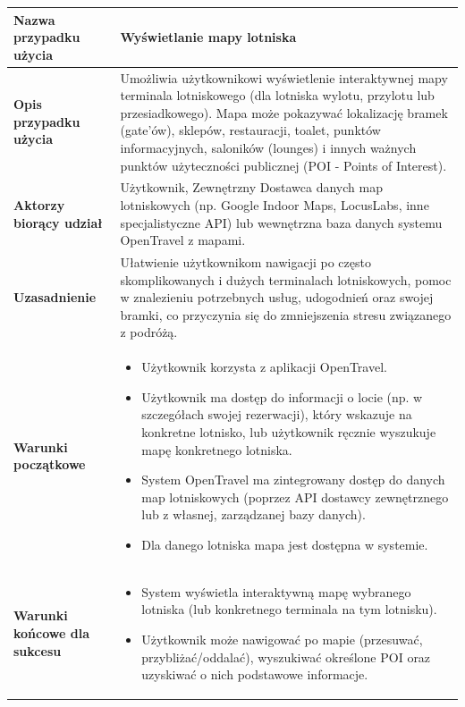 \documentclass[a4paper,12pt]{article}
\begin{document}
\begin{longtable}{|p{\pierwszakolumnaszerokoscPUBLMapaLot}|p{\drugakolumnaszerokoscPUBLMapaLot}|}
    \textbf{Nazwa przypadku użycia} & Wyświetlanie mapy lotniska \\
    \hline
    \textbf{Opis przypadku użycia} & Umożliwia użytkownikowi wyświetlenie interaktywnej mapy terminala lotniskowego (dla lotniska wylotu, przylotu lub przesiadkowego). Mapa może pokazywać lokalizację bramek (gate'ów), sklepów, restauracji, toalet, punktów informacyjnych, saloników (lounges) i innych ważnych punktów użyteczności publicznej (POI - Points of Interest). \\
    \hline
    \textbf{Aktorzy biorący udział} & Użytkownik, Zewnętrzny Dostawca danych map lotniskowych (np. Google Indoor Maps, LocusLabs, inne specjalistyczne API) lub wewnętrzna baza danych systemu OpenTravel z mapami. \\
    \hline
    \textbf{Uzasadnienie} & Ułatwienie użytkownikom nawigacji po często skomplikowanych i dużych terminalach lotniskowych, pomoc w znalezieniu potrzebnych usług, udogodnień oraz swojej bramki, co przyczynia się do zmniejszenia stresu związanego z podróżą. \\
    \hline
    \textbf{Warunki początkowe} &
        \begin{itemize} \itemsep0pt \parskip0pt \parsep0pt
            \item Użytkownik korzysta z aplikacji OpenTravel.
            \item Użytkownik ma dostęp do informacji o locie (np. w szczegółach swojej rezerwacji), który wskazuje na konkretne lotnisko, lub użytkownik ręcznie wyszukuje mapę konkretnego lotniska.
            \item System OpenTravel ma zintegrowany dostęp do danych map lotniskowych (poprzez API dostawcy zewnętrznego lub z własnej, zarządzanej bazy danych).
            \item Dla danego lotniska mapa jest dostępna w systemie.
        \end{itemize} \\
    \hline
    \textbf{Warunki końcowe dla sukcesu} &
        \begin{itemize} \itemsep0pt \parskip0pt \parsep0pt
            \item System wyświetla interaktywną mapę wybranego lotniska (lub konkretnego terminala na tym lotnisku).
            \item Użytkownik może nawigować po mapie (przesuwać, przybliżać/oddalać), wyszukiwać określone POI oraz uzyskiwać o nich podstawowe informacje.
        \end{itemize} \\

\end{longtable}
\end{document}
